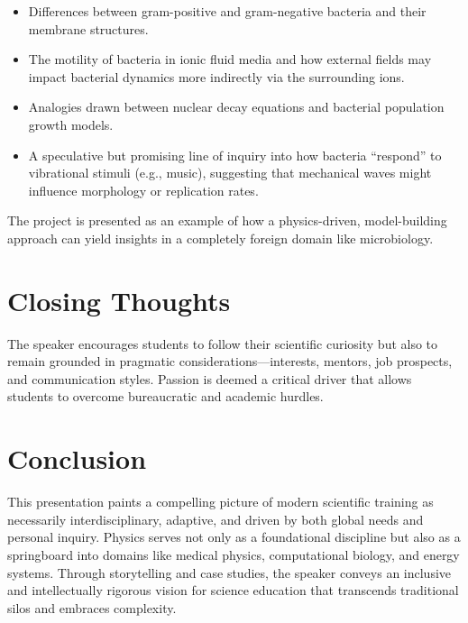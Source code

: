 \documentclass[12pt]{article}
\begin{document}
\begin{itemize}
    \item Differences between gram-positive and gram-negative bacteria and their membrane structures.
    \item The motility of bacteria in ionic fluid media and how external fields may impact bacterial dynamics more indirectly via the surrounding ions.
    \item Analogies drawn between nuclear decay equations and bacterial population growth models.
    \item A speculative but promising line of inquiry into how bacteria ``respond'' to vibrational stimuli (e.g., music), suggesting that mechanical waves might influence morphology or replication rates.
\end{itemize}

The project is presented as an example of how a physics-driven, model-building approach can yield insights in a completely foreign domain like microbiology.

\section*{Closing Thoughts}
The speaker encourages students to follow their scientific curiosity but also to remain grounded in pragmatic considerations---interests, mentors, job prospects, and communication styles. Passion is deemed a critical driver that allows students to overcome bureaucratic and academic hurdles.

\section*{Conclusion}
This presentation paints a compelling picture of modern scientific training as necessarily interdisciplinary, adaptive, and driven by both global needs and personal inquiry. Physics serves not only as a foundational discipline but also as a springboard into domains like medical physics, computational biology, and energy systems. Through storytelling and case studies, the speaker conveys an inclusive and intellectually rigorous vision for science education that transcends traditional silos and embraces complexity.
\end{document}
